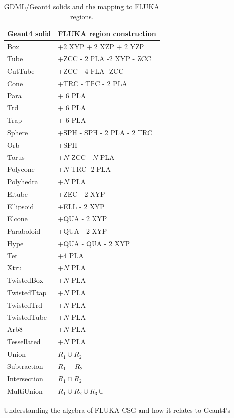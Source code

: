 \documentclass[preprint,12pt]{elsarticle}
\begin{document}
\begin{table}[hbt!]
\centering
\begin{tabular}{ l  l  } \hline
Geant4 solid			& FLUKA region construction		\\ \hline
Box					& +2 XYP + 2 XZP + 2 YZP 		\\
Tube					& +ZCC - 2 PLA -2 XYP - ZCC	 	\\
CutTube				& +ZCC - 4 PLA -ZCC			\\
Cone				& +TRC - TRC - 2 PLA 			\\
Para					& + 6 PLA						\\
Trd					& + 6 PLA						\\
Trap					& + 6 PLA						\\
Sphere				& +SPH - SPH  - 2 PLA - 2 TRC	\\
Orb					& +SPH						\\
Torus				& +$N$ ZCC  - $N$ PLA			\\
Polycone				& +$N$ TRC -2 PLA				\\
Polyhedra				& +$N$ PLA					\\
Eltube				& +ZEC  - 2 XYP				\\
Ellipsoid				& +ELL - 2 XYP		 			\\
Elcone				& +QUA - 2 XYP				\\
Paraboloid			& +QUA - 2 XYP				\\
Hype					& +QUA - QUA - 2 XYP			\\
Tet					& +4 PLA						\\
Xtru					& +$N$ PLA \\
TwistedBox			& +$N$ PLA					\\
TwistedTtap			& +$N$ PLA					\\
TwistedTrd			& +$N$ PLA				 	\\
TwistedTube			& +$N$ PLA					\\
Arb8					& +$N$ PLA					\\
Tessellated			& +$N$ PLA				 	\\
Union				& $R_1 \cup R_2$				\\
Subtraction			& $R_1 - R_2$					\\
Intersection			& $R_1 \cap R_2$				\\
MultiUnion			& $R_1 \cup R_2 \cup R_3 \cup$	\\ \hline
\end{tabular}
\label{tab:geant2fluka}
\caption{GDML/Geant4 solids and the mapping to FLUKA regions.}
\end{table}
Understanding the algebra of FLUKA CSG and how it relates to Geant4's
\end{document}

